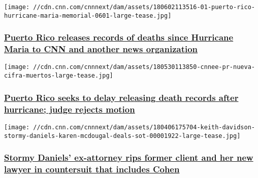 \href{/2018/06/12/politics/sutter-records-release-puerto-rico-invs/index.html}{}

\texttt{[image: //cdn.cnn.com/cnnnext/dam/assets/180602113516-01-puerto-rico-hurricane-maria-memorial-0601-large-tease.jpg]}

\hypertarget{puerto-rico-releases-records-of-deaths-since-hurricane-maria-to-cnn-and-another-news-organization}{%
\subsubsection{\texorpdfstring{\href{/2018/06/12/politics/sutter-records-release-puerto-rico-invs/index.html}{Puerto
Rico releases records of deaths since Hurricane Maria to CNN and another
news
organization}}{Puerto Rico releases records of deaths since Hurricane Maria to CNN and another news organization}}\label{puerto-rico-releases-records-of-deaths-since-hurricane-maria-to-cnn-and-another-news-organization}}

\href{/2018/06/12/politics/sutter-puerto-rico-records-delay-invs/index.html}{}

\texttt{[image: //cdn.cnn.com/cnnnext/dam/assets/180530113850-cnnee-pr-nueva-cifra-muertos-large-tease.jpg]}

\hypertarget{puerto-rico-seeks-to-delay-releasing-death-records-after-hurricane-judge-rejects-motion}{%
\subsubsection{\texorpdfstring{\href{/2018/06/12/politics/sutter-puerto-rico-records-delay-invs/index.html}{Puerto
Rico seeks to delay releasing death records after hurricane; judge
rejects
motion}}{Puerto Rico seeks to delay releasing death records after hurricane; judge rejects motion}}\label{puerto-rico-seeks-to-delay-releasing-death-records-after-hurricane-judge-rejects-motion}}

\href{/2018/06/07/politics/stormy-daniels-ex-attorney-sues/index.html}{}

\texttt{[image: //cdn.cnn.com/cnnnext/dam/assets/180406175704-keith-davidson-stormy-daniels-karen-mcdougal-deals-sot-00001922-large-tease.jpg]}

\hypertarget{stormy-daniels-ex-attorney-rips-former-client-and-her-new-lawyer-in-countersuit-that-includes-cohen}{%
\subsubsection{\texorpdfstring{\href{/2018/06/07/politics/stormy-daniels-ex-attorney-sues/index.html}{Stormy
Daniels' ex-attorney rips former client and her new lawyer in
countersuit that includes
Cohen}}{Stormy Daniels' ex-attorney rips former client and her new lawyer in countersuit that includes Cohen}}\label{stormy-daniels-ex-attorney-rips-former-client-and-her-new-lawyer-in-countersuit-that-includes-cohen}}

